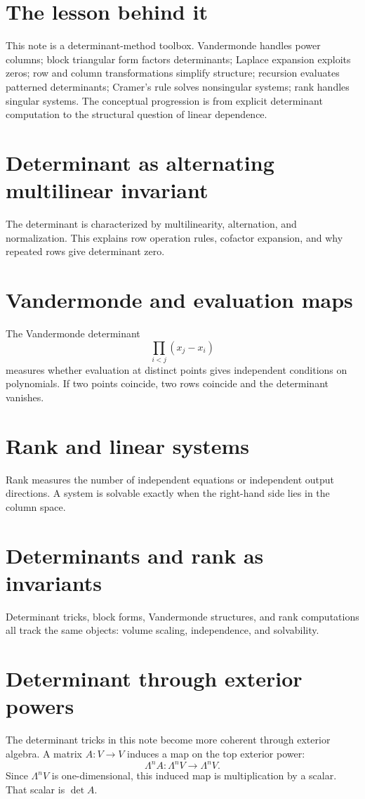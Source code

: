 \section{The lesson behind it}

This note is a determinant-method toolbox.  Vandermonde handles power columns; block triangular form factors determinants; Laplace expansion exploits zeros; row and column transformations simplify structure; recursion evaluates patterned determinants; Cramer's rule solves nonsingular systems; rank handles singular systems.  The conceptual progression is from explicit determinant computation to the structural question of linear dependence.

\section{Determinant as alternating multilinear invariant}
The determinant is characterized by multilinearity, alternation, and normalization.  This explains row operation rules, cofactor expansion, and why repeated rows give determinant zero.
\section{Vandermonde and evaluation maps}
The Vandermonde determinant
\[
\prod_{i<j}(x_j-x_i)
\]
measures whether evaluation at distinct points gives independent conditions on polynomials.  If two points coincide, two rows coincide and the determinant vanishes.
\section{Rank and linear systems}
Rank measures the number of independent equations or independent output directions.  A system is solvable exactly when the right-hand side lies in the column space.
\section{Determinants and rank as invariants}
Determinant tricks, block forms, Vandermonde structures, and rank computations all track the same objects: volume scaling, independence, and solvability.

\section{Determinant through exterior powers}

The determinant tricks in this note become more coherent through exterior algebra.  A matrix $A:V\to V$ induces a map on the top exterior power:
\[
  \Lambda^n A:\Lambda^n V\to\Lambda^n V.
\]
Since $\Lambda^n V$ is one-dimensional, this induced map is multiplication by a scalar.  That scalar is $\det A$.

